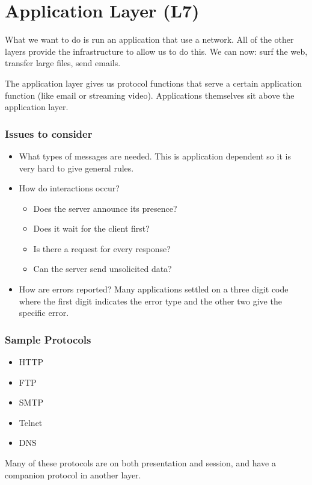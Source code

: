\section{Application Layer (L7)}\label{sec:application_layer_l7_}

What we want to do is run an application that use a network.
All of the other layers provide the infrastructure to allow us to do this.
We can now: surf the web, transfer large files, send emails.

The application layer gives us protocol functions that serve a certain application function (like email or streaming video).
Applications themselves sit above the application layer.

\subsubsection{Issues to consider}\label{ssub:issues_to_consider}

\begin{itemize}
    \item What types of messages are needed.
          This is application dependent so it is very hard to give general rules.
    \item How do interactions occur?
          \begin{itemize}
              \item Does the server announce its presence?
              \item Does it wait for the client first?
              \item Is there a request for every response?
              \item Can the server send unsolicited data?
          \end{itemize}
    \item How are errors reported?
          Many applications settled on a three digit code where the first digit indicates the error type and the other two give the specific error.
\end{itemize}

\subsubsection{Sample Protocols}\label{ssub:sample_protocols}

\begin{itemize}
    \item HTTP
    \item FTP
    \item SMTP
    \item Telnet
    \item DNS
\end{itemize}
\begin{note}
    Many of these protocols are on both presentation and session, and have a companion protocol in another layer.
\end{note}

